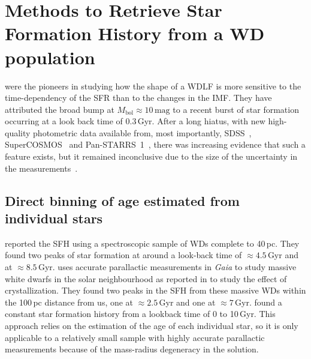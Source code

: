 \documentclass[fleqn,usenatbib]{mnras}
\begin{document}
\section{Methods to Retrieve Star Formation History from a WD population}
\citet{1990ApJ...352..605N} were the pioneers in studying how the shape of
a WDLF is more sensitive to the time-dependency of the SFR than to the changes
in the IMF. They have attributed the broad bump at
$M_{\mathrm{bol}} \approx 10\,\mathrm{mag}$ to a recent burst of star formation
occurring at a look back time of 0.3\,Gyr. After a long hiatus, with new
high-quality photometric data available from, most importantly, 
SDSS~\citep{2000AJ....120.1579Y}, SuperCOSMOS~\citep{2001MNRAS.326.1279H} and
Pan-STARRS~1~\citep{2016arXiv161205560C}, there was increasing evidence that
such a feature exists, but it remained inconclusive due to the size of the
uncertainty in the  measurements~\citep{2006AJ....131..571H,
2011MNRAS.417...93R, 2019MNRAS.482..715L, 2024MNRAS.535.3611Q}.

\subsection{Direct binning of age estimated from individual stars}
\citet[][hereafter, T14]{2014ApJ...791...92T} reported the SFH using a
spectroscopic sample of WDs complete to 40\,pc. They found two peaks of star
formation at around a look-back time of $\approx4.5$\,Gyr and at 
$\approx8.5$\,Gyr. \citet{2019ApJ...878L..11I} uses accurate parallactic 
measurements in \textit{Gaia} to study massive white dwarfs in the solar
neighbourhood as reported in \citet{2019Natur.565..202T} to study the effect of
crystallization. They found two peaks in the SFH from these massive WDs within
the 100\,pc distance from us, one at $\approx2.5$\,Gyr and one at
$\approx7$\,Gyr. \citet[][hereafter, C23]{2023MNRAS.522.1643C} found a constant
star formation history from a lookback time of 0 to 10\,Gyr.
This approach relies on the estimation of the age of each individual star, so
it is only applicable to a relatively small sample with highly accurate
parallactic measurements because of the mass-radius degeneracy in the
solution.

\end{document}

